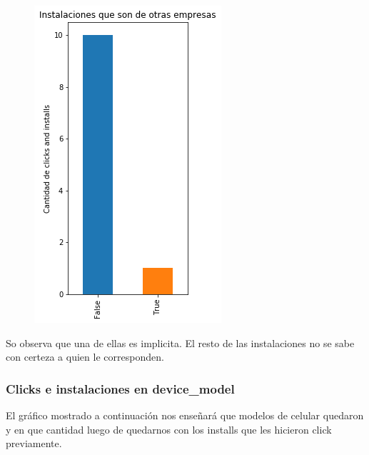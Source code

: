 \documentclass[a4paper, 12pt]{article}
\begin{document}
{{	
		\begin{figure}[H]
			\centering
			\includegraphics[scale = 0.5]{images/clicks-installs/implisit.png}
			\caption{}
		\end{figure}
	

	So observa que una de ellas es implicita. El resto de las instalaciones no se sabe con certeza a quien le corresponden.
	
	\subsubsection{Clicks e instalaciones en device\_model}
	El gráfico mostrado a continuación nos enseñará que modelos de celular quedaron y en que cantidad luego de quedarnos con los installs que les hicieron click previamente.
	
}}
\end{document}
